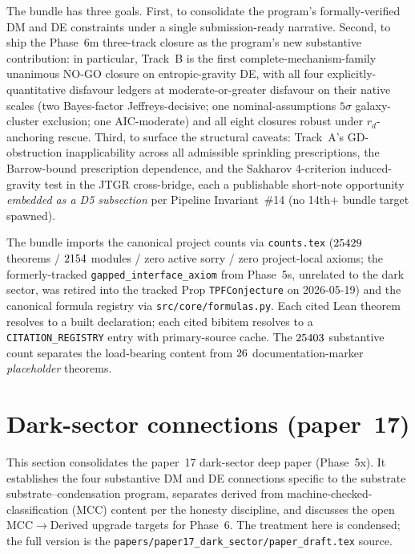 \documentclass[aps,prd,reprint,nofootinbib,superscriptaddress]{revtex4-2}
\begin{document}
The bundle has three goals. First, to consolidate the program's
formally-verified DM and DE constraints under a single submission-ready
narrative. Second, to ship the Phase~6m three-track closure as the
program's new substantive contribution: in particular, Track~B is the
first complete-mechanism-family unanimous NO-GO closure on
entropic-gravity DE, with all four explicitly-quantitative disfavour
ledgers at moderate-or-greater disfavour on their native scales (two
Bayes-factor Jeffreys-decisive; one nominal-assumptions $5\sigma$
galaxy-cluster exclusion; one AIC-moderate) and all eight closures
robust under $r_d$-anchoring rescue.
Third, to surface the structural caveats: Track~A's GD-obstruction
inapplicability across all admissible sprinkling prescriptions, the
Barrow-bound prescription dependence, and the Sakharov 4-criterion
induced-gravity test in the JTGR cross-bridge, each a publishable
short-note opportunity \emph{embedded as a D5 subsection} per Pipeline
Invariant~\#14 (no 14th+ bundle target spawned).

The bundle imports the canonical project counts via
\texttt{counts.tex} ($25429$ theorems / $2154$ modules
/ zero active sorry / zero project-local axioms; the formerly-tracked
\texttt{gapped\_interface\_axiom} from Phase~5s, unrelated to the dark
sector, was retired into the tracked Prop \texttt{TPFConjecture} on
2026-05-19) and the canonical formula
registry via \texttt{src/core/formulas.py}. Each cited Lean theorem
resolves to a built declaration; each cited bibitem resolves to a
\texttt{CITATION\_REGISTRY} entry with primary-source cache. The
$25403$ substantive count separates the load-bearing
content from $26$ documentation-marker
\emph{placeholder} theorems.

\section{Dark-sector connections (paper~17)}
\label{sec:paper17}
\label{sec:d5-paper17_dark_sector}

This section consolidates the paper~17 dark-sector deep paper (Phase~5x).
It establishes the four substantive DM and DE connections specific to
the substrate substrate--condensation program, separates derived from
machine-checked-classification (MCC) content per the honesty discipline,
and discusses the open MCC$\to$Derived upgrade targets for Phase~6.
The treatment here is condensed; the full version is the
\texttt{papers/paper17\_dark\_sector/paper\_draft.tex} source.
\end{document}
